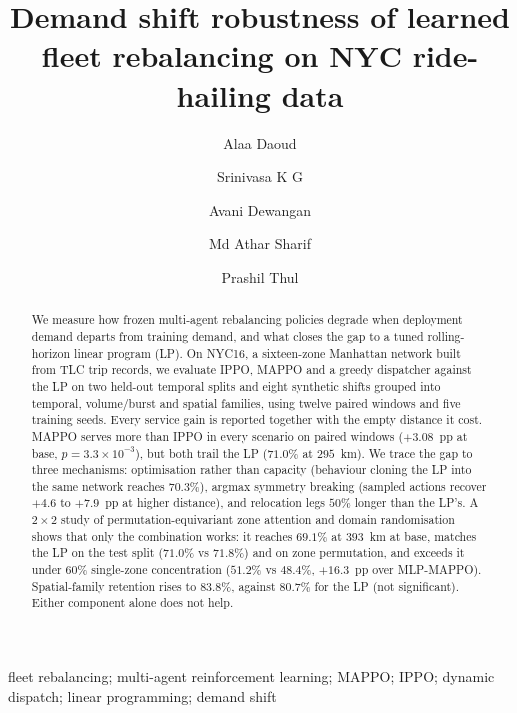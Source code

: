 \documentclass[3p,times,procedia]{elsarticle}
\begin{document}
\begin{frontmatter}
\title{Demand shift robustness of learned fleet rebalancing on NYC ride-hailing data}
\author[a]{Alaa Daoud}
\author[c]{Srinivasa K G}
\author[b]{Avani Dewangan}
\author[b]{Md Athar Sharif}
\author[b]{Prashil Thul}
\address[a]{LAMIH, CNRS UMR 8201, INSA Hauts-de-France, Universit\'e Polytechnique Hauts-de-France, Valenciennes, France}
\address[b]{Department of Computer Science and Engineering, IIIT Naya Raipur, Naya Raipur, India}
\address[c]{Department of Data Science and Artificial Intelligence, IIIT Naya Raipur, Naya Raipur, India}
\begin{abstract}
We measure how frozen multi-agent rebalancing policies degrade when deployment demand departs from training demand, and what closes the gap to a tuned rolling-horizon linear program (LP). On NYC16, a sixteen-zone Manhattan network built from TLC trip records, we evaluate IPPO, MAPPO and a greedy dispatcher against the LP on two held-out temporal splits and eight synthetic shifts grouped into temporal, volume/burst and spatial families, using twelve paired windows and five training seeds. Every service gain is reported together with the empty distance it cost. MAPPO serves more than IPPO in every scenario on paired windows ($+3.08$~pp at base, $p=3.3\times10^{-3}$), but both trail the LP ($71.0\%$ at $295$~km). We trace the gap to three mechanisms: optimisation rather than capacity (behaviour cloning the LP into the same network reaches $70.3\%$), argmax symmetry breaking (sampled actions recover $+4.6$ to $+7.9$~pp at higher distance), and relocation legs $50\%$ longer than the LP's. A $2\times2$ study of permutation-equivariant zone attention and domain randomisation shows that only the combination works: it reaches $69.1\%$ at $393$~km at base, matches the LP on the test split ($71.0\%$ vs $71.8\%$) and on zone permutation, and exceeds it under $60\%$ single-zone concentration ($51.2\%$ vs $48.4\%$, $+16.3$~pp over MLP-MAPPO). Spatial-family retention rises to $83.8\%$, against $80.7\%$ for the LP (not significant). Either component alone does not help.
\end{abstract}
\begin{keyword}
fleet rebalancing; multi-agent reinforcement learning; MAPPO; IPPO; dynamic dispatch; linear programming; demand shift
\end{keyword}
\end{frontmatter}
\end{document}
